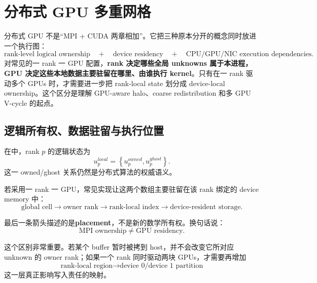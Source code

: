 \chapter{分布式 GPU 多重网格}
\label{ch:distributed-gpu}

\begin{keybox}
分布式 GPU 不是“MPI + CUDA 两章相加”。它把三种原本分开的概念同时放进一个执行图：
\begin{equation}
\boxed{
\text{rank-level logical ownership}
\quad+\quad
\text{device residency}
\quad+\quad
\text{CPU/GPU/NIC execution dependencies}.
}
\label{eq:distributed-gpu-three-layers}
\end{equation}
对常见的一 rank 一 GPU 配置，\textbf{rank 决定哪些全局 unknowns 属于本进程，GPU 决定这些本地数据主要驻留在哪里、由谁执行 kernel}。只有在一 rank 驱动多个 GPUs 时，才需要进一步把 rank-local state 划分成 device-local ownership。这个区分是理解 GPU-aware halo、coarse redistribution 和多 GPU V-cycle 的起点。
\end{keybox}

\section{逻辑所有权、数据驻留与执行位置}

在中，rank $p$ 的逻辑状态为
\begin{equation}
u_p^{local}
=
\left\{
u_p^{owned},
u_p^{ghost}
\right\}.
\end{equation}
这一 owned/ghost 关系仍然是分布式算法的权威语义。

若采用一 rank 一 GPU，常见实现让这两个数组主要驻留在该 rank 绑定的 device memory 中：
\begin{equation}
\text{global cell}
\rightarrow
\text{owner rank}
\rightarrow
\text{rank-local index}
\rightarrow
\text{device-resident storage}.
\label{eq:distributed-gpu-address-chain}
\end{equation}

最后一条箭头描述的是\textbf{placement}，不是新的数学所有权。换句话说：
\begin{equation}
\boxed{
\text{MPI ownership}
\neq
\text{GPU residency}.
}
\end{equation}

这个区别非常重要。若某个 buffer 暂时被拷到 host，并不会改变它所对应 unknown 的 owner rank；如果一个 rank 同时驱动两块 GPUs，才需要再增加
\begin{equation}
\text{rank-local region}
\rightarrow
\text{device 0/device 1 partition}
\end{equation}
这一层真正影响写入责任的映射。

